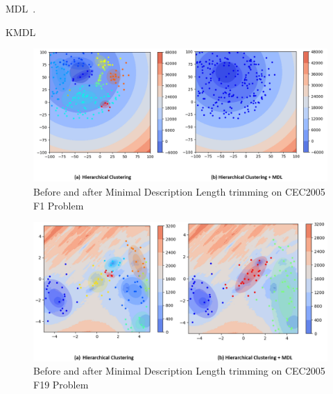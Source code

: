 MDL~\cite{Rissanen:1984:Universal}.

KMDL~\cite{Kyrgyzov:2007:KMDL}

\begin{figure}
\centering
\includegraphics[width=\textwidth]{MDL_comparison}
\caption{Before and after Minimal Description Length trimming on CEC2005 F1 Problem}\label{fig:MDL_comparison}
\end{figure}

\begin{figure}
\centering
\includegraphics[width=\textwidth]{MDL_comparison_F19}
\caption{Before and after Minimal Description Length trimming on CEC2005 F19 Problem}\label{fig:MDL_comparison_F19}
\end{figure}






